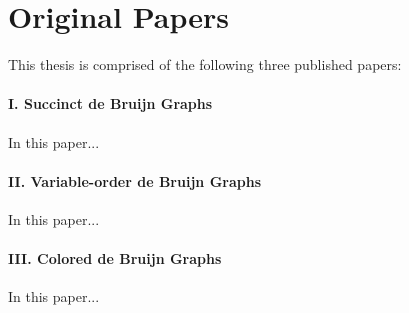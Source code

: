 
\section*{Original Papers}

This thesis is comprised of the following three published papers:

\paragraph{I. Succinct de Bruijn Graphs}

In this paper...

\paragraph{II. Variable-order de Bruijn Graphs}

In this paper...

\paragraph{III. Colored de Bruijn Graphs}

In this paper...
%
